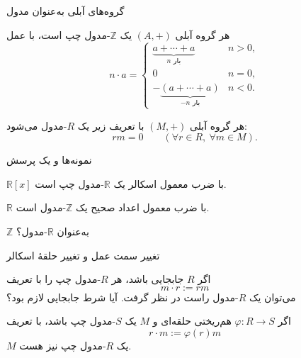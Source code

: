 \begin{frame}{گروه‌های آبلی به‌عنوان مدول}
    \label{lec04:abelian-z-module}
    \begin{example}
        هر گروه آبلی $(A,+)$ یک $\mathbb Z$-مدول چپ است، با عمل
        \[
            n\cdot a=
            \begin{cases}
                \underbrace{a+\cdots+a}_{n\text{ بار}} & n>0,\\[3pt]
                0 & n=0,\\[3pt]
                -\underbrace{(a+\cdots+a)}_{-n\text{ بار}} & n<0.
            \end{cases}
        \]
    \end{example}
    \begin{example}
        هر گروه آبلی $(M,+)$ با تعریف زیر یک $R$-مدول می‌شود:
        \[
            rm=0\qquad(\forall r\in R,\ \forall m\in M).
        \]
    \end{example}
\end{frame}

\begin{frame}{نمونه‌ها و یک پرسش}
    \label{lec04:scalar-examples}
    \begin{example}
        $\mathbb R[x]$ با ضرب معمول اسکالر یک $\mathbb R$-مدول چپ است.
    \end{example}
    \begin{example}
        $\mathbb R$ با ضرب معمول اعداد صحیح یک $\mathbb Z$-مدول است.
    \end{example}
    \begin{exercise}
        $\mathbb Z$ به‌عنوان $\mathbb R$-مدول؟
    \end{exercise}
\end{frame}

\begin{frame}{تغییر سمت عمل و تغییر حلقهٔ اسکالر}
    \label{lec04:restriction-scalars}
    \begin{remark}
        اگر $R$ جابجایی باشد، هر $R$-مدول چپ را با تعریف
        \[
            m\cdot r:=rm
        \]
        می‌توان یک $R$-مدول راست در نظر گرفت.
        آیا شرط جابجایی لازم بود؟
    \end{remark}
    \begin{remark}
        اگر $\varphi:R\to S$ هم‌ریختی حلقه‌ای و $M$ یک $S$-مدول چپ باشد،
        با تعریف
        \[
            r\cdot m:=\varphi(r)m
        \]
        $M$ یک $R$-مدول چپ نیز هست.
    \end{remark}
\end{frame}

